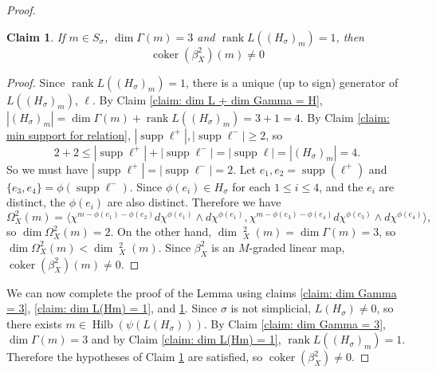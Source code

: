 \documentclass[10pt,a4paper]{amsart}
\newtheorem{claim}{Claim}
\DeclareMathOperator{\Hilb}{Hilb}
\DeclareMathOperator{\coker}{coker}
\DeclareMathOperator{\dani}{\widetilde{\Omega}}
\DeclareMathOperator{\rank}{rank}
\DeclareMathOperator{\supp}{supp}
\begin{document}
\begin{proof}
    \begin{claim} \label{claim: coker 2 non zero}
        If $m \in S_\sigma$, $\dim \Gamma(m) = 3$ and $\rank L((H_\sigma)_m)=1$, then 
        \begin{equation}
            \coker(\beta_X^2)(m) \neq 0
        \end{equation}
    \end{claim}
    \begin{proof}
        Since $\rank L((H_\sigma)_m)=1$, there is a unique (up to sign) generator of $L((H_\sigma)_m)$, $\ell$. By Claim \ref{claim: dim L + dim Gamma = H}, $|(H_\sigma)_m|= \dim \Gamma(m) + \rank L((H_\sigma)_m) = 3 + 1 = 4$. By Claim \ref{claim: min support for relation}, $|\supp\ell^+|, |\supp \ell^-| \geq 2$, so
        \begin{equation}
            2 + 2 \leq |\supp\ell^+|+ |\supp\ell^-| = |\supp\ell|  = |(H_\sigma)_m| = 4.
        \end{equation}
        So we must have $|\supp\ell^+| = |\supp \ell^-| = 2$. Let $e_1, e_2 = \supp(\ell^+)$ and $\{e_3,e_4 \} = \phi( \supp \ell^-)$. Since $\phi(e_i) \in H_\sigma$ for each $1 \leq i \leq 4$, and the $e_i$ are distinct, the $\phi(e_i)$ are also distinct. Therefore we have
        \begin{equation}
            \Omega^2_X(m) = \langle \chi^{m-\phi(e_1)-\phi(e_2)} d\chi^{\phi(e_1)}\wedge d\chi^{\phi(e_1)}, \chi^{m-\phi(e_3)-\phi(e_4)} d\chi^{\phi(e_3)}\wedge d\chi^{\phi(e_4)} \rangle,
        \end{equation}
        so $\dim \Omega^2_X(m) = 2$. On the other hand, $\dim \dani^2_X(m) = \dim \Gamma(m)=3$, so $\dim \Omega^2_X(m) < \dim \dani_X^2(m)$. Since $\beta^2_X$ is an $M$-graded linear map, $\coker(\beta^2_X)(m) \neq 0$. 
    \end{proof}

We can now complete the proof of the Lemma using claims \ref{claim: dim Gamma = 3}, \ref{claim: dim L(Hm) = 1}, and \ref{claim: coker 2 non zero}. Since $\sigma$ is not simplicial, $L(H_\sigma) \neq 0$, so there exists $m \in \Hilb(\psi(L(H_\sigma)))$. By Claim \ref{claim: dim Gamma = 3}, $\dim \Gamma(m)=3$ and by Claim \ref{claim: dim L(Hm) = 1}, $\rank L((H_\sigma)_m)=1$. Therefore the hypotheses of Claim \ref{claim: coker 2 non zero} are satisfied, so $\coker(\beta_X^2)\neq 0$.
\end{proof}
\end{document}
